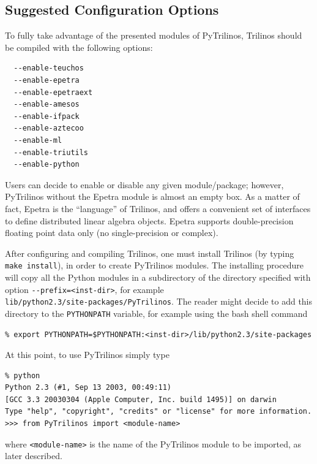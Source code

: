 \documentclass[10pt,relax]{SANDreport}
\newcommand{\PyTrilinos}{{PyTrilinos}}
\begin{document}
\subsection{Suggested Configuration Options}

To fully take advantage of the presented modules of \PyTrilinos, Trilinos
should be compiled with the following options:
\begin{verbatim}
  --enable-teuchos    
  --enable-epetra     
  --enable-epetraext  
  --enable-amesos    
  --enable-ifpack     
  --enable-aztecoo     
  --enable-ml         
  --enable-triutils   
  --enable-python
\end{verbatim}

Users can decide to enable or disable any given module/package; however,
PyTrilinos without the Epetra module is almost an empty box.  As a matter of
fact, Epetra is the ``language'' of Trilinos, and offers a convenient set of
interfaces to define distributed linear algebra objects. Epetra supports
double-precision floating point data only (no single-precision or complex). 

\smallskip

After configuring and compiling Trilinos, one must install Trilinos 
(by typing \verb!make install!), in order to create PyTrilinos modules.
The installing procedure will copy all the Python modules in a subdirectory of
the directory specified with option \verb!--prefix=<inst-dir>!, for example \\
\verb!lib/python2.3/site-packages/PyTrilinos!. The reader might decide 
to add this directory to the \verb!PYTHONPATH! variable, for example using the 
bash shell command
\begin{verbatim}
% export PYTHONPATH=$PYTHONPATH:<inst-dir>/lib/python2.3/site-packages
\end{verbatim}

At this point, to use PyTrilinos  simply type
\begin{verbatim}
% python
Python 2.3 (#1, Sep 13 2003, 00:49:11) 
[GCC 3.3 20030304 (Apple Computer, Inc. build 1495)] on darwin
Type "help", "copyright", "credits" or "license" for more information.
>>> from PyTrilinos import <module-name>
\end{verbatim}
where \verb!<module-name>! is the name of the PyTrilinos module to be
imported, as later described.
\end{document}
